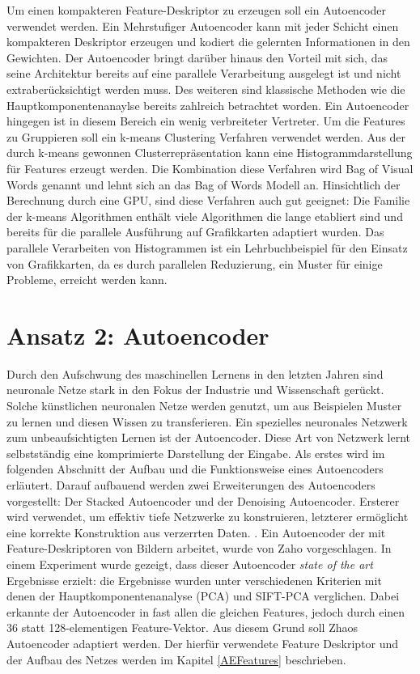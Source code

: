 Um einen kompakteren Feature-Deskriptor zu erzeugen soll ein Autoencoder verwendet werden. Ein Mehrstufiger Autoencoder kann mit jeder Schicht einen kompakteren Deskriptor erzeugen und kodiert die gelernten Informationen in den Gewichten. Der Autoencoder bringt darüber hinaus den Vorteil mit sich, das seine Architektur bereits auf eine parallele Verarbeitung ausgelegt ist und nicht \glqq extra\grqq berücksichtigt werden muss. Des weiteren sind klassische Methoden wie die Hauptkomponentenanaylse bereits zahlreich betrachtet worden. Ein Autoencoder hingegen ist in diesem Bereich ein wenig verbreiteter Vertreter.  
Um die Features zu Gruppieren soll ein k-means Clustering Verfahren verwendet werden. Aus der durch k-means gewonnen Clusterrepräsentation kann eine Histogrammdarstellung für Features erzeugt werden. Die Kombination diese Verfahren wird Bag of Visual Words genannt und lehnt sich an das Bag of Words Modell an. Hinsichtlich der Berechnung durch eine GPU, sind diese Verfahren auch gut geeignet: Die Familie der k-means Algorithmen enthält viele Algorithmen die lange etabliert sind und bereits für die parallele Ausführung auf Grafikkarten adaptiert wurden. Das parallele Verarbeiten von Histogrammen ist ein Lehrbuchbeispiel für den Einsatz von Grafikkarten, da es durch parallelen Reduzierung, ein Muster für einige Probleme, erreicht werden kann. 

\section{Ansatz 2: Autoencoder}

Durch den Aufschwung des maschinellen Lernens in den letzten Jahren sind neuronale Netze stark in den Fokus der Industrie und Wissenschaft gerückt. Solche künstlichen neuronalen Netze werden genutzt, um aus Beispielen Muster zu lernen und diesen Wissen zu transferieren. 
Ein spezielles neuronales Netzwerk zum unbeaufsichtigten Lernen ist der Autoencoder. Diese Art von Netzwerk lernt selbstständig eine komprimierte Darstellung der Eingabe. 
Als erstes wird im folgenden Abschnitt der Aufbau und die Funktionsweise eines Autoencoders erläutert. Darauf aufbauend werden zwei Erweiterungen des Autoencoders vorgestellt: Der Stacked Autoencoder und der Denoising Autoencoder. Ersterer wird verwendet, um effektiv tiefe Netzwerke zu konstruieren, letzterer ermöglicht eine korrekte Konstruktion aus verzerrten Daten.
. Ein Autoencoder der mit Feature-Deskriptoren von Bildern arbeitet, wurde von Zaho \cite{aed2016} vorgeschlagen. In einem Experiment wurde gezeigt, dass dieser Autoencoder \textit{state of the art} Ergebnisse erzielt: die Ergebnisse wurden unter verschiedenen Kriterien mit denen der Hauptkomponentenanalyse (PCA) und SIFT-PCA verglichen. Dabei erkannte der Autoencoder in fast allen die gleichen Features, jedoch durch einen 36 statt 128-elementigen Feature-Vektor. Aus diesem Grund soll Zhaos Autoencoder adaptiert werden. Der hierfür verwendete Feature Deskriptor und der Aufbau des Netzes werden im Kapitel \ref{AEFeatures} beschrieben.

